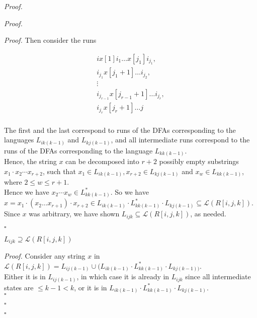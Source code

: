 \documentclass[a4paper]{article}
\newenvironment{proof}{\begin{breakbox}\textit{Proof.}}{\hfill$\square$\end{breakbox}}
\newcommand{\mc}{\mathcal}
\renewcommand{\L}{\mc{L}}
\begin{document}
\begin{proof}
\begin{proof}
\begin{enumerate}
\begin{proof}
                        Then consider the runs 

                        \begin{align*}
                            i x[1] i_1 \ldots x[j_1] i_{j_1},\\
                            i_{j_1} x[j_1 + 1] \ldots i_{j_2},\\
                            \vdots\\
                            i_{j_{r-1}} x[j_{r-1}+1] \ldots i_{j_r},\\
                            i_{j_r} x[j_r + 1] \ldots j\\
                        \end{align*}

                        The first and the last correspond to runs of the DFAs corresponding to the languages $L_{ik(k-1)}$ and $L_{kj(k-1)}$, and all intermediate runs correspond to the runs of the DFAs
                        corresponding to the language $L_{kk(k-1)}$.\\

                        Hence, the string $x$ can be decomposed into $r + 2$ possibly empty substrings $x_1 \cdot x_2 \cdots x_{r+2}$, such that $x_1 \in L_{ik(k-1)}, x_{r+2} \in L_{kj(k-1)}$ and
                        $x_w \in L_{kk(k-1)}$, where $2 \le w \le r + 1$.\\

                        Hence we have $x_2 \cdots x_w \in L_{kk(k-1)}^*$. So we have $x = x_1 \cdot (x_2 \ldots x_{r+1}) \cdot x_{r+2} \in L_{ik(k-1)} \cdot L_{kk(k-1)}^* \cdot L_{kj(k-1)}
                        \subseteq \L(R[i,
                        j, k])$.\\

                        Since $x$ was arbitrary, we have shown $L_{ijk} \subseteq \L(R[i, j, k])$, as needed.

                    \end{proof}
                    \begin{claim}
                        $L_{ijk} \supseteq \L(R[i, j, k])$
                    \end{claim}
                    \begin{proof}
                        Consider any string $x$ in $\L(R[i, j, k]) = L_{ij(k-1)} \cup (L_{ik(k-1)} \cdot L_{kk(k-1)}^* \cdot L_{kj(k-1))}$.\\

                        Either it is in $L_{ij(k-1)}$, in which case it is already in $L_{ijk}$ since all intermediate states are $\le k - 1 < k$, or it is in $L_{ik(k-1)} \cdot L_{kk(k-1)}^* \cdot
                        L_{kj(k-1)}$.\\


\end{proof}
\end{enumerate}
\end{proof}
\end{proof}
\end{document}
